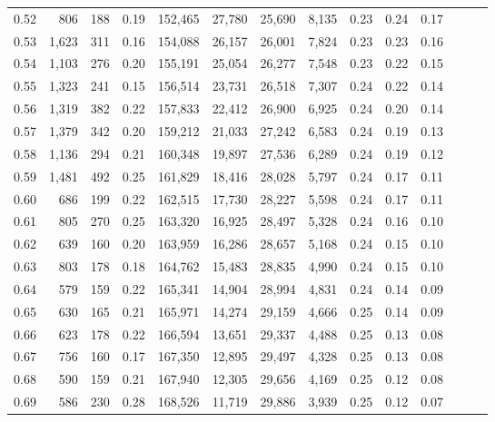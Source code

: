 \begin{tabular}{rrrrrrrrrrrrrr}
0.52 &     806 &    188 &  0.19 &  152,465 &   27,780 &  25,690 &   8,135 &  0.23 &  0.24 &      0.17 \\
0.53 &   1,623 &    311 &  0.16 &  154,088 &   26,157 &  26,001 &   7,824 &  0.23 &  0.23 &      0.16 \\
0.54 &   1,103 &    276 &  0.20 &  155,191 &   25,054 &  26,277 &   7,548 &  0.23 &  0.22 &      0.15 \\
0.55 &   1,323 &    241 &  0.15 &  156,514 &   23,731 &  26,518 &   7,307 &  0.24 &  0.22 &      0.14 \\
0.56 &   1,319 &    382 &  0.22 &  157,833 &   22,412 &  26,900 &   6,925 &  0.24 &  0.20 &      0.14 \\
0.57 &   1,379 &    342 &  0.20 &  159,212 &   21,033 &  27,242 &   6,583 &  0.24 &  0.19 &      0.13 \\
0.58 &   1,136 &    294 &  0.21 &  160,348 &   19,897 &  27,536 &   6,289 &  0.24 &  0.19 &      0.12 \\
0.59 &   1,481 &    492 &  0.25 &  161,829 &   18,416 &  28,028 &   5,797 &  0.24 &  0.17 &      0.11 \\
0.60 &     686 &    199 &  0.22 &  162,515 &   17,730 &  28,227 &   5,598 &  0.24 &  0.17 &      0.11 \\
0.61 &     805 &    270 &  0.25 &  163,320 &   16,925 &  28,497 &   5,328 &  0.24 &  0.16 &      0.10 \\
0.62 &     639 &    160 &  0.20 &  163,959 &   16,286 &  28,657 &   5,168 &  0.24 &  0.15 &      0.10 \\
0.63 &     803 &    178 &  0.18 &  164,762 &   15,483 &  28,835 &   4,990 &  0.24 &  0.15 &      0.10 \\
0.64 &     579 &    159 &  0.22 &  165,341 &   14,904 &  28,994 &   4,831 &  0.24 &  0.14 &      0.09 \\
0.65 &     630 &    165 &  0.21 &  165,971 &   14,274 &  29,159 &   4,666 &  0.25 &  0.14 &      0.09 \\
0.66 &     623 &    178 &  0.22 &  166,594 &   13,651 &  29,337 &   4,488 &  0.25 &  0.13 &      0.08 \\
0.67 &     756 &    160 &  0.17 &  167,350 &   12,895 &  29,497 &   4,328 &  0.25 &  0.13 &      0.08 \\
0.68 &     590 &    159 &  0.21 &  167,940 &   12,305 &  29,656 &   4,169 &  0.25 &  0.12 &      0.08 \\
0.69 &     586 &    230 &  0.28 &  168,526 &   11,719 &  29,886 &   3,939 &  0.25 &  0.12 &      0.07 \\

\end{tabular}
